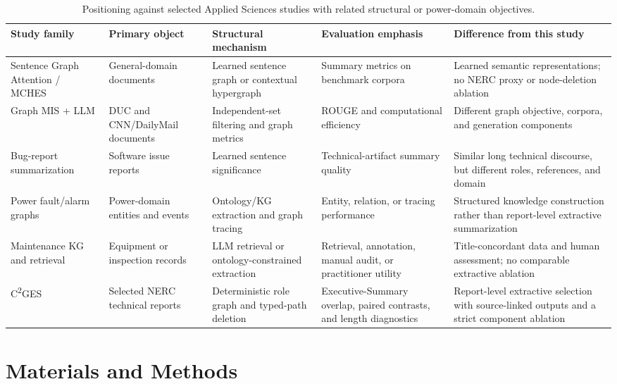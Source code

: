 \documentclass[applsci,article,submit,moreauthors]{Definitions/mdpi}
\newcommand{\cges}{C\textsuperscript{2}GES}
\begin{document}
\begin{table}[H]
\caption{Positioning against selected Applied Sciences studies with related structural or power-domain objectives.}
\label{tab:related-comparison}\centering\scriptsize
\begin{tabularx}{\textwidth}{p{2.5cm}p{2.4cm}p{2.5cm}p{2.5cm}X}
\toprule
Study family & Primary object & Structural mechanism & Evaluation emphasis & Difference from this study\\
\midrule
Sentence Graph Attention / MCHES \cite{siragusa2022sentencegraph,onan2024mches} & General-domain documents & Learned sentence graph or contextual hypergraph & Summary metrics on benchmark corpora & Learned semantic representations; no NERC proxy or node-deletion ablation\\
Graph MIS + LLM \cite{hark2025mis} & DUC and CNN/DailyMail documents & Independent-set filtering and graph metrics & ROUGE and computational efficiency & Different graph objective, corpora, and generation components\\
Bug-report summarization \cite{koh2022bugreport} & Software issue reports & Learned sentence significance & Technical-artifact summary quality & Similar long technical discourse, but different roles, references, and domain\\
Power fault/alarm graphs \cite{liu2022powerfault,ma2025alarm} & Power-domain entities and events & Ontology/KG extraction and graph tracing & Entity, relation, or tracing performance & Structured knowledge construction rather than report-level extractive summarization\\
Maintenance KG and retrieval \cite{cao2024coalmaintenance,zgg2026bridge} & Equipment or inspection records & LLM retrieval or ontology-constrained extraction & Retrieval, annotation, manual audit, or practitioner utility & Title-concordant data and human assessment; no comparable extractive ablation\\
\cges{} & Selected NERC technical reports & Deterministic role graph and typed-path deletion & Executive-Summary overlap, paired contrasts, and length diagnostics & Report-level extractive selection with source-linked outputs and a strict component ablation\\
\bottomrule
\end{tabularx}
\end{table}

\section{Materials and Methods}
\end{document}
